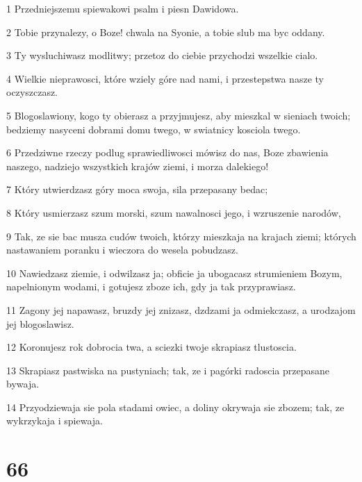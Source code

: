 \par 1 Przedniejszemu spiewakowi psalm i piesn Dawidowa.
\par 2 Tobie przynalezy, o Boze! chwala na Syonie, a tobie slub ma byc oddany.
\par 3 Ty wysluchiwasz modlitwy; przetoz do ciebie przychodzi wszelkie cialo.
\par 4 Wielkie nieprawosci, które wziely góre nad nami, i przestepstwa nasze ty oczyszczasz.
\par 5 Blogoslawiony, kogo ty obierasz a przyjmujesz, aby mieszkal w sieniach twoich; bedziemy nasyceni dobrami domu twego, w swiatnicy kosciola twego.
\par 6 Przedziwne rzeczy podlug sprawiedliwosci mówisz do nas, Boze zbawienia naszego, nadziejo wszystkich krajów ziemi, i morza dalekiego!
\par 7 Który utwierdzasz góry moca swoja, sila przepasany bedac;
\par 8 Który usmierzasz szum morski, szum nawalnosci jego, i wzruszenie narodów,
\par 9 Tak, ze sie bac musza cudów twoich, którzy mieszkaja na krajach ziemi; których nastawaniem poranku i wieczora do wesela pobudzasz.
\par 10 Nawiedzasz ziemie, i odwilzasz ja; obficie ja ubogacasz strumieniem Bozym, napelnionym wodami, i gotujesz zboze ich, gdy ja tak przyprawiasz.
\par 11 Zagony jej napawasz, bruzdy jej znizasz, dzdzami ja odmiekczasz, a urodzajom jej blogoslawisz.
\par 12 Koronujesz rok dobrocia twa, a sciezki twoje skrapiasz tlustoscia.
\par 13 Skrapiasz pastwiska na pustyniach; tak, ze i pagórki radoscia przepasane bywaja.
\par 14 Przyodziewaja sie pola stadami owiec, a doliny okrywaja sie zbozem; tak, ze wykrzykaja i spiewaja.

\chapter{66}

